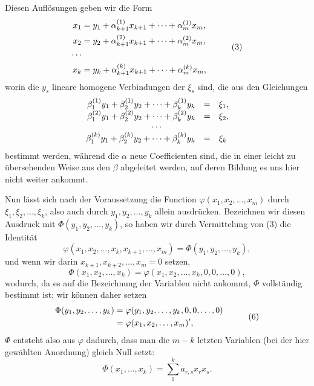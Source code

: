 \documentclass[11pt]{article}
\begin{document}
Diesen Aufl\"osungen geben wir die Form
\begin{equation}
\begin{aligned}
 x_1&=y_1+\alpha^{(1)}_{k+1}x_{k+1}+\cdots+\alpha^{(1)}_mx_m,\cr
 x_2&=y_2+\alpha^{(2)}_{k+1}x_{k+1}+\cdots+\alpha^{(2)}_mx_m,\cr
 \cdots&\cr
 x_k&=y_k+\alpha^{(k)}_{k+1}x_{k+1}+\cdots+\alpha^{(k)}_mx_m,
\end{aligned}
\tag{3}
\end{equation}
worin die $y_s$ lineare homogene Verbindungen der $\xi_s$ sind, die aus den Gleichungen
\[
\begin{array}{rcl}
 \beta^{(1)}_1y_1+\beta^{(1)}_2y_2+\cdots+\beta^{(1)}_ky_k&=&\xi_1,\cr
 \beta^{(2)}_1y_1+\beta^{(2)}_2y_2+\cdots+\beta^{(2)}_ky_k&=&\xi_2,\cr
 \multicolumn{3}{c}{\cdots}\cr
 \beta^{(k)}_1y_1+\beta^{(k)}_2y_2+\cdots+\beta^{(k)}_ky_k&=&\xi_k
\end{array}
\]
bestimmt werden, w\"ahrend die $\alpha$ neue Coefficienten sind, die in einer leicht zu \"ubersehenden Weise aus den $\beta$ abgeleitet werden, auf deren Bildung es uns hier nicht weiter ankommt.

Nun l\"asst sich nach der Voraussetzung die Function $\varphi(x_1,x_2,\ldots,x_m)$ durch $\xi_1,\xi_2,\ldots,\xi_k$, also auch durch $y_1,y_2,\ldots,y_k$ allein ausdr\"ucken. Bezeichnen wir diesen Ausdruck mit $\Phi(y_1,y_2,\ldots,y_k)$, so haben wir durch Vermittelung von (3) die Identit\"at
\begin{equation}
        \varphi(x_1,x_2,\ldots,x_k,x_{k+1},\ldots,x_m)=\Phi(y_1,y_2,\ldots,y_k),
\tag{4}
\end{equation}
und wenn wir darin $x_{k+1},x_{k+2},\ldots,x_m=0$ setzen,
\begin{equation}
        \Phi(x_1,x_2,
        \ldots,x_k)=\varphi(x_1,x_2,\ldots,x_k,0,0,\ldots,0),
\tag{5}
\end{equation}
wodurch, da es auf die Bezeichnung der Variablen nicht ankommt, $\Phi$ vollst\"andig bestimmt ist; wir k\"onnen daher setzen
\begin{equation}
\begin{aligned}
        \Phi(y_1,y_2,\ldots,y_k)&=\varphi(y_1,y_2,\ldots,y_k,0,0,\ldots,0)\cr
        &=\varphi(x_1,x_2,\ldots,x_m)',
\end{aligned}
\tag{6}
\end{equation}
$\Phi$ entsteht also aus $\varphi$ dadurch, dass man die $m-k$ letzten Variablen (bei der hier gew\"ahlten Anordnung) gleich Null setzt:
\begin{equation}
        \Phi(x_1,\ldots,x_k)=\sum_{1}^{k}a_{r,s}x_rx_s.
\tag{7}
\end{equation}
\end{document}
